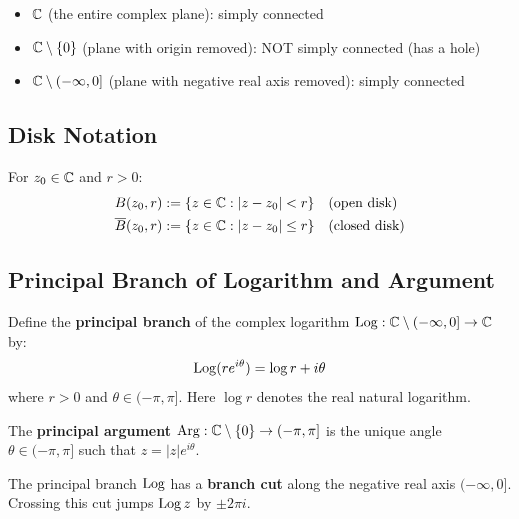 \begin{example}
\begin{itemize}
\item $\mathbb{C}$ (the entire complex plane): simply connected
\item $\mathbb{C} \setminus \{0\}$ (plane with origin removed): NOT simply connected (has a hole)
\item $\mathbb{C} \setminus (-\infty, 0]$ (plane with negative real axis removed): simply connected
\end{itemize}
\end{example}

\subsection{Disk Notation}

For $z_0 \in \mathbb{C}$ and $r > 0$:
\begin{align}
B(z_0, r) &:= \{z \in \mathbb{C} : |z - z_0| < r\} \quad \text{(open disk)} \\
\overline{B}(z_0, r) &:= \{z \in \mathbb{C} : |z - z_0| \leq r\} \quad \text{(closed disk)}
\end{align}

\subsection{Principal Branch of Logarithm and Argument}

\begin{definition}\label{def:principal-log}
Define the \textbf{principal branch} of the complex logarithm $\operatorname{Log}: \mathbb{C} \setminus (-\infty, 0] \to \mathbb{C}$ by:
\begin{equation}
\operatorname{Log}(r e^{i\theta}) = \log r + i\theta
\end{equation}
where $r > 0$ and $\theta \in (-\pi, \pi]$. Here $\log r$ denotes the real natural logarithm.
\end{definition}

\begin{definition}
The \textbf{principal argument} $\operatorname{Arg}: \mathbb{C} \setminus \{0\} \to (-\pi, \pi]$ is the unique angle $\theta \in (-\pi, \pi]$ such that $z = |z| e^{i\theta}$.
\end{definition}

\begin{remark}
The principal branch $\operatorname{Log}$ has a \textbf{branch cut} along the negative real axis $(-\infty, 0]$. Crossing this cut jumps $\operatorname{Log} z$ by $\pm 2\pi i$.
\end{remark}

